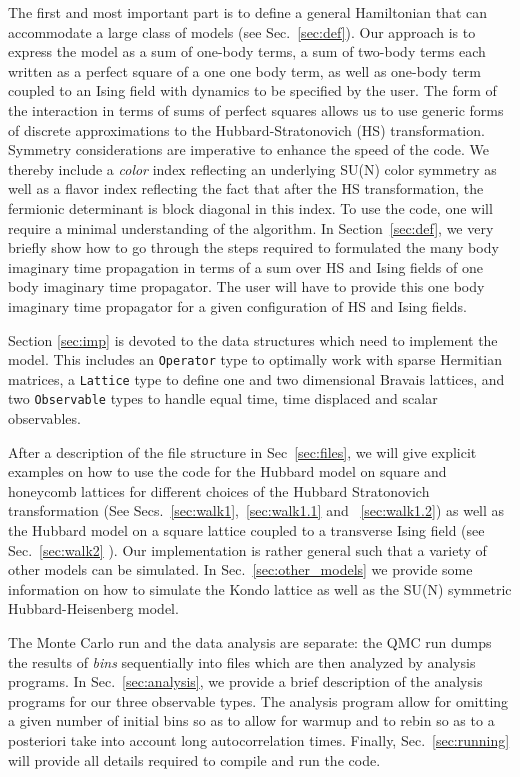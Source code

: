 The first and most important  part is to define a general Hamiltonian  that  can  accommodate a large class of models  (see Sec.~\ref{sec:def}). 
Our approach is to express the model as a sum of one-body terms, a sum of two-body terms each written as a perfect square of a one one body term, as well as one-body  term  coupled to an Ising field with  dynamics to be specified by the user. 
The form of the interaction in terms of sums of perfect squares allows us to use generic forms of  discrete  approximations to the  Hubbard-Stratonovich (HS)  transformation. 
Symmetry considerations  are  imperative to enhance the speed of the code.  
We thereby include a \textit{color} index  reflecting  an underlying  SU(N) color symmetry as  well as a flavor index  reflecting  the fact that  after  the HS  transformation,  the  fermionic determinant is block diagonal in this index.   
To use the code, one will require a minimal understanding of the algorithm.  
In Section~\ref{sec:def}, we very briefly show how to go through  the steps required  to formulated the many body imaginary time propagation in terms of a sum  over HS and Ising fields  of one body  imaginary time propagator.   
The user will have to provide this one body imaginary time propagator for a given configuration of   HS and  Ising fields.   

Section \ref{sec:imp} is devoted to the data structures which  need to implement the model.  
This includes  an \texttt{Operator} type to  optimally work with sparse Hermitian matrices, a \texttt{Lattice} type  to define one and two dimensional Bravais lattices, and   two   \texttt{Observable} types to handle equal time, time displaced and scalar observables. 

After a description of the file structure  in Sec~\ref{sec:files},  we will give explicit examples on how to use the code for  the  Hubbard model on square and honeycomb lattices  for different choices of the Hubbard  Stratonovich transformation  (See Secs.~\ref{sec:walk1},~\ref{sec:walk1.1} and ~\ref{sec:walk1.2})  as well as the Hubbard model on a square lattice coupled to a transverse Ising field (see Sec.~\ref{sec:walk2} ).   Our implementation is rather general such that  a variety of other models can be simulated. In Sec.~\ref{sec:other_models}   we provide  some information on how to simulate the Kondo lattice as well as the SU(N) symmetric Hubbard-Heisenberg model. 

The Monte Carlo run and the  data analysis  are separate: the QMC run  dumps the results of \textit{bins}  sequentially into files  which are then analyzed by  analysis programs. In Sec.~\ref{sec:analysis}, we provide a brief description of the analysis programs  for our three observable types.  The analysis program allow for omitting a given number of initial bins so as to allow for warmup and to rebin  so as to a posteriori take into account long autocorrelation times.  Finally, Sec.~\ref{sec:running}  will provide all details required to compile and run the code. 
